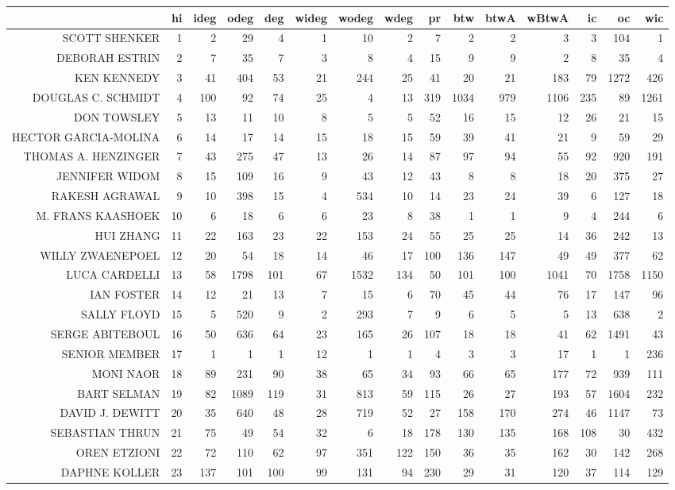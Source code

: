 \documentclass{bakalarka}
\begin{document}
\begin{table}[!ht]
\centering
\begin{sideways}
\begin{scriptsize}
\begin{tabular}{r|r|rrrrrrrrrrrrr}
\toprule
&hi&ideg&odeg&deg&wideg&wodeg&wdeg&pr&btw&btwA&wBtwA&ic&oc&wic\\
\midrule
SCOTT SHENKER&1&2&29&4&1&10&2&7&2&2&3&3&104&1\\
DEBORAH ESTRIN&2&7&35&7&3&8&4&15&9&9&2&8&35&4\\
KEN KENNEDY&3&41&404&53&21&244&25&41&20&21&183&79&1272&426\\
DOUGLAS C. SCHMIDT&4&100&92&74&25&4&13&319&1034&979&1106&235&89&1261\\
DON TOWSLEY&5&13&11&10&8&5&5&52&16&15&12&26&21&15\\
HECTOR GARCIA-MOLINA&6&14&17&14&15&18&15&59&39&41&21&9&59&29\\
THOMAS A. HENZINGER&7&43&275&47&13&26&14&87&97&94&55&92&920&191\\
JENNIFER WIDOM&8&15&109&16&9&43&12&43&8&8&18&20&375&27\\
RAKESH AGRAWAL&9&10&398&15&4&534&10&14&23&24&39&6&127&18\\
M. FRANS KAASHOEK&10&6&18&6&6&23&8&38&1&1&9&4&244&6\\
HUI ZHANG&11&22&163&23&22&153&24&55&25&25&14&36&242&13\\
WILLY ZWAENEPOEL&12&20&54&18&14&46&17&100&136&147&49&49&377&62\\
LUCA CARDELLI&13&58&1798&101&67&1532&134&50&101&100&1041&70&1758&1150\\
IAN FOSTER&14&12&21&13&7&15&6&70&45&44&76&17&147&96\\
SALLY FLOYD&15&5&520&9&2&293&7&9&6&5&5&13&638&2\\
SERGE ABITEBOUL&16&50&636&64&23&165&26&107&18&18&41&62&1491&43\\
SENIOR MEMBER&17&1&1&1&12&1&1&4&3&3&17&1&1&236\\
MONI NAOR&18&89&231&90&38&65&34&93&66&65&177&72&939&111\\
BART SELMAN&19&82&1089&119&31&813&59&115&26&27&193&57&1604&232\\
DAVID J. DEWITT&20&35&640&48&28&719&52&27&158&170&274&46&1147&73\\
SEBASTIAN THRUN&21&75&49&54&32&6&18&178&130&135&168&108&30&432\\
OREN ETZIONI&22&72&110&62&97&351&122&150&36&35&162&30&142&268\\
DAPHNE KOLLER&23&137&101&100&99&131&94&230&29&31&120&37&114&129\\

\end{tabular}
\end{scriptsize}
\end{sideways}
\end{table}
\end{document}
